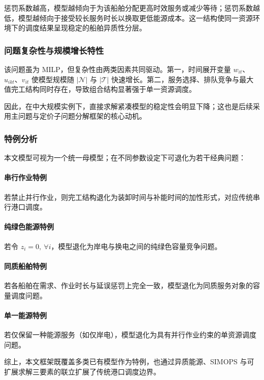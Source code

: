 \documentclass[UTF8, a4paper, 12pt]{ctexart}
\theoremstyle{plain}
\theoremstyle{definition}
\theoremstyle{remark}
\begin{document}
惩罚系数越高，模型越倾向于为该船舶分配更高时效服务或减少等待；惩罚系数越低，模型越倾向于接受较长服务时长以换取更低能源成本。这一结构使同一资源环境下的调度结果呈现稳定的船舶异质性分层。

\subsubsection{问题复杂性与规模增长特性}

该问题虽为 MILP，但复杂性由两类因素共同驱动。第一，时间展开变量 $w_{it}$、$u_{ikt}$、$v_{it}$ 使模型规模随 $|\mathcal{N}|$ 与 $|\mathcal{T}|$ 快速增长。第二，服务选择、排队竞争与最大值完工结构同时存在，导致组合结构显著强于单一资源调度。

因此，在中大规模实例下，直接求解紧凑模型的稳定性会明显下降；这也是后续采用主问题与定价子问题分解框架的核心动机。

\subsubsection{特例分析}

本文模型可视为一个统一母模型；在不同参数设定下可退化为若干经典问题：

\paragraph{串行作业特例}
若禁止并行作业，则完工结构退化为装卸时间与补能时间的加性形式，对应传统串行港口调度。

\paragraph{纯绿色能源特例}
若令 $z_i=0,\ \forall i$，模型退化为岸电与换电之间的纯绿色容量竞争问题。

\paragraph{同质船舶特例}
若各船舶在需求、作业时长与延误惩罚上完全一致，模型退化为同质服务对象的容量调度问题。

\paragraph{单一能源特例}
若仅保留一种能源服务（如仅岸电），模型退化为具有并行作业约束的单资源调度问题。

综上，本文框架既覆盖多类已有模型作为特例，也通过异质能源、SIMOPS 与可扩展求解三要素的联立扩展了传统港口调度边界。
\end{document}
